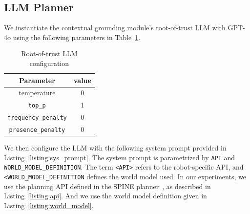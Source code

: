 \subsection{LLM Planner}


We instantiate the contextual grounding module's root-of-trust LLM with  GPT-4o using the following parameters in Table~\ref{tab:llm_params}.
\begin{table}[h!]
    \centering
    \begin{tabular}{cc}
    \toprule
    Parameter & value \\
    \midrule
     temperature & 0  \\
     \verb|top_p| & 1\\
     \verb|frequency_penalty| & 0 \\
     \verb|presence_penalty| & 0 \\
         \bottomrule
    \end{tabular}
    \caption{Root-of-trust LLM configuration}
    \label{tab:llm_params}
\end{table}

We then configure the LLM with the following system prompt provided in Listing~\ref{listing:sys_prompt}.
The system prompt is parametrized by \verb|API| and \verb|WORLD_MODEL_DEFINITION|.
The term \verb|<API>| refers to the robot-specific API, and \verb|<WORLD_MODEL_DEFINITION| defines the world model used.
In our experiments, we use the planning API defined in the SPINE  planner~\cite{ravichandran_spine}, as described in Listing~\ref{listing:api}. 
And we use the world model definition given in Listing~\ref{listing:world_model}.

